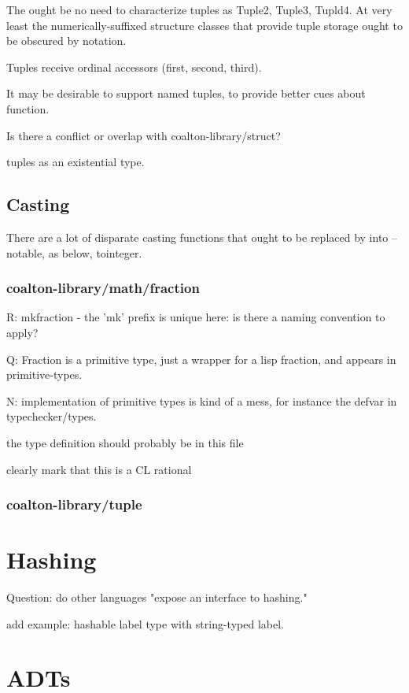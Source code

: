 \documentclass[12pt]{article}
\begin{document}
The ought be no need to characterize tuples as Tuple2, Tuple3,
Tupld4. At very least the numerically-suffixed structure classes that
provide tuple storage ought to be obscured by notation.

Tuples receive ordinal accessors (first, second, third).

It may be desirable to support named tuples, to provide better cues
about function.

Is there a conflict or overlap with coalton-library/struct?

tuples as an existential type.

\subsection{Casting}

There are a lot of disparate casting functions that ought to be
replaced by into -- notable, as below, tointeger.


\subsubsection{coalton-library/math/fraction}

R: mkfraction - the 'mk' prefix is unique here: is there a naming convention to apply?

Q: Fraction is a primitive type, just a wrapper for a lisp fraction, and appears in primitive-types.

N: implementation of primitive types is kind of a mess, for instance
the defvar in typechecker/types.

the type definition should probably be in this file

clearly mark that this is a CL rational

\subsubsection{coalton-library/tuple}

\section{Hashing}

Question: do other languages "expose an interface to hashing."

 add example: hashable label type with string-typed label.

\section{ADTs}
\end{document}
